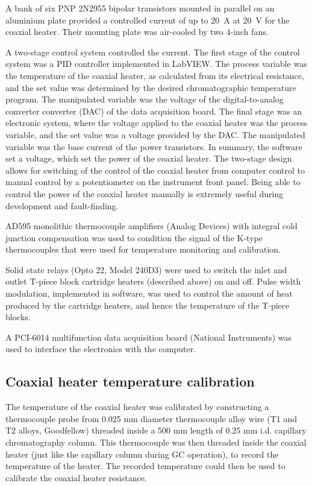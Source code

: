 \documentclass[aip,rsi,preprint,graphicx]{revtex4-1} %
\begin{document}
A bank of six PNP 2N2955 bipolar transistors mounted in parallel on an aluminium
plate provided a controlled current of up to \SI{20}{\ampere} at \SI{20}{\volt}
for the coaxial heater. Their mounting plate was air-cooled by two 4-inch fans.

A two-stage control system controlled the current. The first stage of the
control system was a PID controller implemented in LabVIEW. The process variable
was the temperature of the coaxial heater, as calculated from its electrical
resistance, and the set value was determined by the desired chromatographic
temperature program. The manipulated variable was the voltage of the
digital-to-analog converter converter (DAC) of the data acquisition board. The
final stage was an electronic system, where the voltage applied to the coaxial
heater was the process variable, and the set value was a voltage provided by the
DAC. The manipulated variable was the base current of the power transistors.
In summary, the software set a voltage, which set the power of the coaxial
heater. The two-stage design allows for switching of the control of the coaxial
heater from computer control to manual control by a potentiometer on the
instrument front panel. Being able to control the power of the coaxial heater
manually is extremely useful during development and fault-finding.

AD595 monolithic thermocouple amplifiers (Analog Devices) with integral cold
junction compensation was used to condition the signal of the K-type
thermocouples that were used for temperature monitoring and calibration.

Solid state relays (Opto 22, Model 240D3) were used to switch the inlet and
outlet T-piece block cartridge heaters (described above) on and off. Pulse width
modulation, implemented in software, was used to control the amount of heat
produced by the cartridge heaters, and hence the temperature of the T-piece blocks. 

A PCI-6014 multifunction data acquisition board (National
Instruments\texttrademark{}) was used to interface the electronics with the
computer.

\subsection{Coaxial heater temperature calibration}

The temperature of the coaxial heater was calibrated by constructing a
thermocouple probe from 0.025 mm diameter thermocouple alloy wire (T1 and T2
alloys, Goodfellow) threaded inside a 500 mm length of 0.25 mm i.d.
capillary chromatography column. This thermocouple was then threaded inside the
coaxial heater (just like the capillary column during GC operation), to record
the temperature of the heater. The recorded temperature could then be used to
calibrate the coaxial heater resistance.
\end{document}
